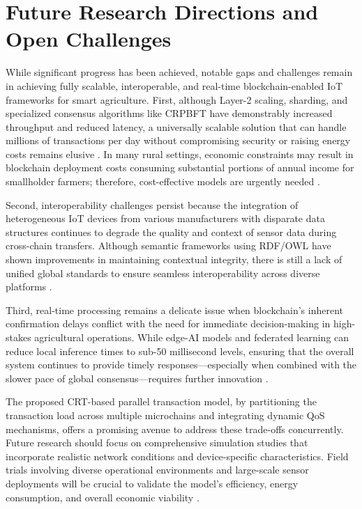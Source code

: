 \documentclass[12pt,onecolumn]{IEEEtran} %
\begin{document}
\section{Future Research Directions and Open Challenges}\label{sec:future}
While significant progress has been achieved, notable gaps and challenges remain in achieving fully scalable, interoperable, and real-time blockchain-enabled IoT frameworks for smart agriculture. First, although Layer-2 scaling, sharding, and specialized consensus algorithms like CRPBFT have demonstrably increased throughput and reduced latency, a universally scalable solution that can handle millions of transactions per day without compromising security or raising energy costs remains elusive \cite{huang2025digitaltraceabilityin, irfan2025aniotdrivensmart}. In many rural settings, economic constraints may result in blockchain deployment costs consuming substantial portions of annual income for smallholder farmers; therefore, cost-effective models are urgently needed \cite{irfan2025aniotdrivensmart, irfan2025aniotdrivensmart}.

Second, interoperability challenges persist because the integration of heterogeneous IoT devices from various manufacturers with disparate data structures continues to degrade the quality and context of sensor data during cross-chain transfers. Although semantic frameworks using RDF/OWL have shown improvements in maintaining contextual integrity, there is still a lack of unified global standards to ensure seamless interoperability across diverse platforms \cite{irfan2025aniotdrivensmart, huang2025digitaltraceabilityin}.

Third, real-time processing remains a delicate issue when blockchain's inherent confirmation delays conflict with the need for immediate decision-making in high-stakes agricultural operations. While edge-AI models and federated learning can reduce local inference times to sub-50 millisecond levels, ensuring that the overall system continues to provide timely responses---especially when combined with the slower pace of global consensus---requires further innovation \cite{huang2025digitaltraceabilityin, huang2025digitaltraceabilityin}.

The proposed CRT-based parallel transaction model, by partitioning the transaction load across multiple microchains and integrating dynamic QoS mechanisms, offers a promising avenue to address these trade-offs concurrently. Future research should focus on comprehensive simulation studies that incorporate realistic network conditions and device-specific characteristics. Field trials involving diverse operational environments and large-scale sensor deployments will be crucial to validate the model's efficiency, energy consumption, and overall economic viability \cite{thiruvenkatasamy2025anonlinetool, thiruvenkatasamy2025anonlinetool}.
\end{document}
